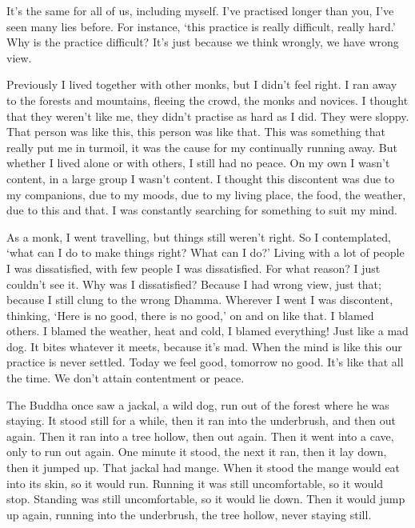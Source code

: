 It's the same for all of us, including myself. I've practised longer than you, I've seen many lies before. For instance, `this practice is really difficult, really hard.' Why is the practice difficult? It's just because we think wrongly, we have wrong view. 

Previously I lived together with other monks, but I didn't feel right. I ran away to the forests and mountains, fleeing the crowd, the monks and novices. I thought that they weren't like me, they didn't practise as hard as I did. They were sloppy. That person was like this, this person was like that. This was something that really put me in turmoil, it was the cause for my continually running away. But whether I lived alone or with others, I still had no peace. On my own I wasn't content, in a large group I wasn't content. I thought this discontent was due to my companions, due to my moods, due to my living place, the food, the weather, due to this and that. I was constantly searching for something to suit my mind. 

As a  monk, I went travelling, but things still weren't right. So I contemplated, `what can I do to make things right? What can I do?' Living with a lot of people I was dissatisfied, with few people I was dissatisfied. For what reason? I just couldn't see it. Why was I dissatisfied? Because I had wrong view, just that; because I still clung to the wrong Dhamma. Wherever I went I was discontent, thinking, `Here is no good, there is no good,' on and on like that. I blamed others. I blamed the weather, heat and cold, I blamed everything! Just like a mad dog. It bites whatever it meets, because it's mad. When the mind is like this our practice is never settled. Today we feel good, tomorrow no good. It's like that all the time. We don't attain contentment or peace. 

The Buddha once saw a jackal, a wild dog, run out of the forest where he was staying. It stood still for a while, then it ran into the underbrush, and then out again. Then it ran into a tree hollow, then out again. Then it went into a cave, only to run out again. One minute it stood, the next it ran, then it lay down, then it jumped up. That jackal had mange. When it stood the mange would eat into its skin, so it would run. Running it was still uncomfortable, so it would stop. Standing was still uncomfortable, so it would lie down. Then it would jump up again, running into the underbrush, the tree hollow, never staying still. 

